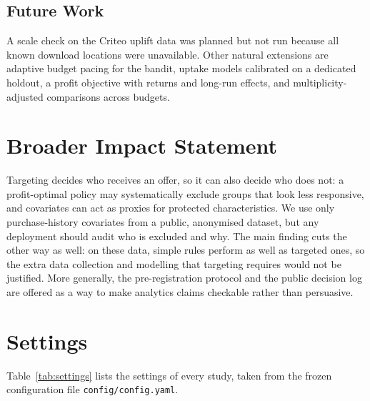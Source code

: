 \documentclass[10pt,twocolumn]{article}
\begin{document}
\subsection{Future Work}
A scale check on the Criteo uplift data \citep{diemert2018} was planned but not run because all known
download locations were unavailable. Other natural extensions are adaptive budget pacing for the
bandit, uptake models calibrated on a dedicated holdout, a profit objective with returns and
long-run effects, and multiplicity-adjusted comparisons across budgets.

\section{Broader Impact Statement}
\label{sec:impact}

Targeting decides who receives an offer, so it can also decide who does not: a profit-optimal policy
may systematically exclude groups that look less responsive, and covariates can act as proxies for
protected characteristics. We use only purchase-history covariates from a public,
anonymised dataset, but any deployment should audit who is excluded and why. The main finding cuts
the other way as well: on these data, simple rules perform as well as targeted ones, so the extra
data collection and modelling that targeting requires would not be justified. More generally, the
pre-registration protocol and the public decision log are offered as a way to make analytics claims
checkable rather than persuasive.

\FloatBarrier



\appendix
\section{Settings}
\label{app:settings}
Table~\ref{tab:settings} lists the settings of every study, taken from the frozen configuration file
\texttt{config/config.yaml}.
\end{document}

